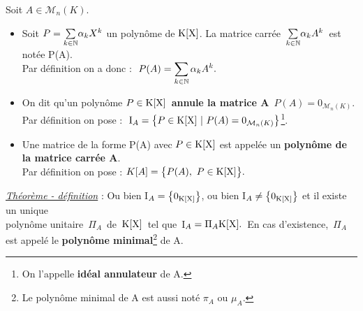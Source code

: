Soit \(A\in \mathcal{M}_{n}(K).\)
\begin{itemize}[leftmargin=0.2cm, label=•]
    \item Soit \(P=\underset{k\in \mathbb{N}}{\sum}\alpha_k X^k \) un polynôme de $\text{K}[\text{X}]$. La matrice carrée \(\,\underset{k\in \mathbb{N}}{\sum}\alpha_k A^k \,\) est notée P(A).\vspace{-0.1cm}\\
    Par définition on a donc : \(\displaystyle \ P(A)=\sum_{k\in \NN}\alpha_k A^k.\)\vspace{0.1cm}

    \item On dit qu'un polynôme \(P\in \text{K}[\text{X}]\,\) \textbf{annule la matrice A} \ssi \(\,\displaystyle P(A)=0_{\mathcal{M}_n(K)}\).\vspace{0.1cm}\\
    Par définition on pose : \(\displaystyle \;\text{I}_A = \bigl\{P\in \poly \ \vert \ P(A)=0_{\mathcal{M}_n(K)}\bigr\}\)\footnote{On l'appelle \textbf{idéal annulateur} de A.}.\vspace{0.1cm}

    \item Une matrice de la forme P(A) avec \(P\in \text{K}[\text{X}]\) est appelée un \textbf{polynôme de la matrice carrée A}.\vspace{0.1cm}\\
    Par définition on pose : \(K[A]=\bigl\{P(A),\ P\in \poly\bigr\}.\)
\end{itemize}

\vspace{1.7cm}

\underline{\emph{Théorème - définition}} : Ou bien I\(_A=\left\{0_{\text{K}[\text{X}]}\right\}\), ou bien I\(_A\neq\left\{0_{\text{K}[\text{X}]}\right\}\) et il existe un unique\vspace{0.1cm}\\
polynôme unitaire \(\,\Pi_A\,\) de $\,\text{K}[\text{X}]\,$ tel que\, I\(_A=\Pi_A\text{K}[\text{X}].\,\) En cas d'existence, \(\,\Pi_A\,\) est appelé le \textbf{polynôme minimal}\footnote{Le polynôme minimal de A est aussi noté $\pi_A$ ou $\mu_A$.} de A.

\newpage

